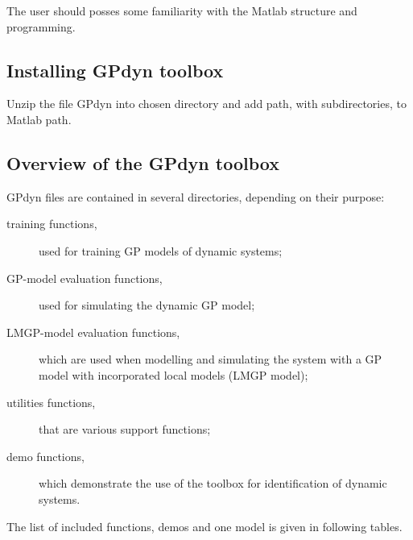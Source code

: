 \documentclass[12pt,twoside]{article}
\begin{document}
The user should posses some familiarity with the Matlab
structure and programming.

\subsection{Installing GPdyn toolbox}

Unzip the file GPdyn into chosen directory and add path, with
subdirectories, to Matlab path.


\subsection{Overview of the GPdyn toolbox}

GPdyn files are contained in several directories, depending on
their purpose:
 \begin{description}
 \item [training functions,] used for training GP models of dynamic systems;
 \item [GP-model evaluation functions,] used for simulating the dynamic
 GP model;
 \item [LMGP-model evaluation functions,] which are used when modelling and simulating the system with a GP model with incorporated local models (LMGP model);
 \item [utilities functions,] that are various support functions;
 \item [demo functions,] which demonstrate the use of the toolbox
 for identification of dynamic systems.
 \end{description}

\clearpage

 The list of included functions, demos and one model is given in
 following tables.
\end{document}
